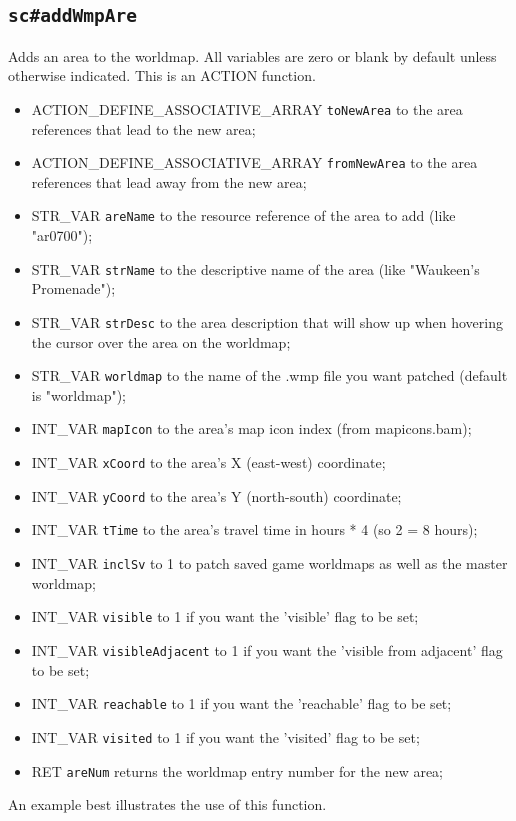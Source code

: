 \documentclass{article}
\def\DEFINE#1{{\tt \bf #1}\label{#1}\index{#1}}
\begin{document}
\subsection{\DEFINE{sc\#addWmpAre}}
Adds an area to the worldmap. All variables are zero or blank by default unless otherwise indicated.
This is an ACTION function.

\begin{itemize}
\item ACTION_DEFINE_ASSOCIATIVE_ARRAY \verb+toNewArea+ to the area references that lead to the new area;
\item ACTION_DEFINE_ASSOCIATIVE_ARRAY \verb+fromNewArea+ to the area references that lead away from the new area;
\item STR_VAR \verb+areName+ to the resource reference of the area to add (like "ar0700");
\item STR_VAR \verb+strName+ to the descriptive name of the area (like "Waukeen's Promenade");
\item STR_VAR \verb+strDesc+ to the area description that will show up when hovering the cursor over the area on the worldmap;
\item STR_VAR \verb+worldmap+ to the name of the .wmp file you want patched (default is "worldmap");
\item INT_VAR \verb+mapIcon+ to the area's map icon index (from mapicons.bam);
\item INT_VAR \verb+xCoord+ to the area's X (east-west) coordinate;
\item INT_VAR \verb+yCoord+ to the area's Y (north-south) coordinate;
\item INT_VAR \verb+tTime+ to the area's travel time in hours * 4 (so 2 = 8 hours);
\item INT_VAR \verb+inclSv+ to 1 to patch saved game worldmaps as well as the master worldmap;
\item INT_VAR \verb+visible+ to 1 if you want the 'visible' flag to be set;
\item INT_VAR \verb+visibleAdjacent+ to 1 if you want the 'visible from adjacent' flag to be set;
\item INT_VAR \verb+reachable+ to 1 if you want the 'reachable' flag to be set;
\item INT_VAR \verb+visited+ to 1 if you want the 'visited' flag to be set;
\item RET \verb+areNum+ returns the worldmap entry number for the new area;
\end{itemize}
An example best illustrates the use of this function.
\end{document}
